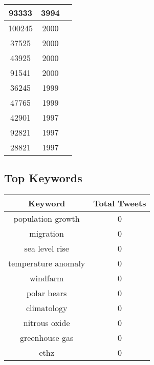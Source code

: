 \documentclass{article}\usepackage[T1]{fontenc}
\begin{document}
\begin{tabular}{|c|c|c|}
 \hline
93333 & 3994\\ 
 \hline
100245 & 2000\\ 
 \hline
37525 & 2000\\ 
 \hline
43925 & 2000\\ 
 \hline
91541 & 2000\\ 
 \hline
36245 & 1999\\ 
 \hline
47765 & 1999\\ 
 \hline
42901 & 1997\\ 
 \hline
92821 & 1997\\ 
 \hline
28821 & 1997\\ 
 \hline
\end{tabular}\subsection*{Top Keywords}\begin{tabular}{|c|c|}         \hline         Keyword & Total Tweets \\ 
 \hline
population growth & 0\\ 
 \hline
migration & 0\\ 
 \hline
sea level rise & 0\\ 
 \hline
temperature anomaly & 0\\ 
 \hline
windfarm & 0\\ 
 \hline
polar bears & 0\\ 
 \hline
climatology & 0\\ 
 \hline
nitrous oxide & 0\\ 
 \hline
greenhouse gas & 0\\ 
 \hline
ethz & 0\\ 
 \hline
\end{tabular}
\end{document}
